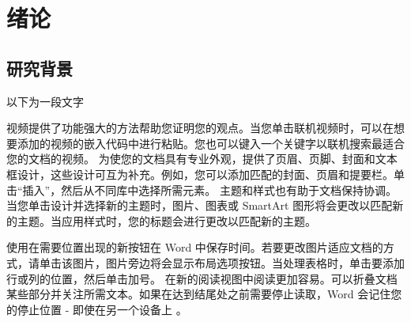 \chapter{绪论}

\section{研究背景}

以下为一段文字

视频提供了功能强大的方法帮助您证明您的观点。当您单击联机视频时，可以在想要添加的视频的嵌入代码中进行粘贴。您也可以键入一个关键字以联机搜索最适合您的文档的视频。
为使您的文档具有专业外观，提供了页眉、页脚、封面和文本框设计，这些设计可互为补充。例如，您可以添加匹配的封面、页眉和提要栏。单击“插入”，然后从不同库中选择所需元素。
主题和样式也有助于文档保持协调。当您单击设计并选择新的主题时，图片、图表或 SmartArt 图形将会更改以匹配新的主题。当应用样式时，您的标题会进行更改以匹配新的主题。
\par 使用在需要位置出现的新按钮在 Word 中保存时间。若要更改图片适应文档的方式，请单击该图片，图片旁边将会显示布局选项按钮。当处理表格时，单击要添加行或列的位置，然后单击加号。
在新的阅读视图中阅读更加容易。可以折叠文档某些部分并关注所需文本。如果在达到结尾处之前需要停止读取，Word 会记住您的停止位置 - 即使在另一个设备上
。
